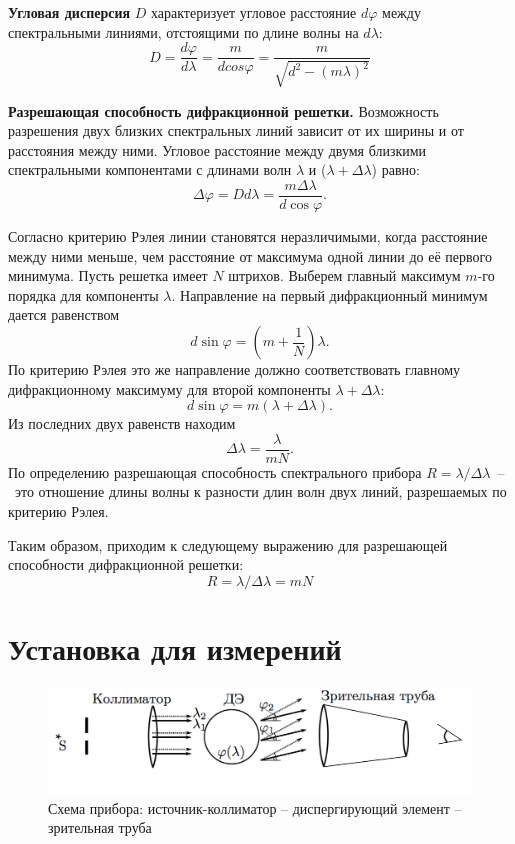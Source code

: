\documentclass{letask}
\begin{document}
\textbf{Угловая дисперсия} $D$ характеризует угловое расстояние $d \varphi$ между спектральными линиями, отстоящими по длине волны на $d \lambda$:
\[
D=\dfrac{d \varphi}{d \lambda}=\frac{m}{d cos \varphi}=\dfrac{m}{\sqrt{d^{2}-(m \lambda)^{2}}}
\]

\textbf{Разрешающая способность дифракционной решетки.} Возможность разрешения двух близких спектральных линий зависит от их ширины и от расстояния между ними. Угловое расстояние между двумя близкими спектральными компонентами с длинами волн $\lambda$ и ($\lambda + \Delta \lambda$) равно:
\[
\Delta \varphi =  D d \lambda = \frac{m \Delta \lambda}{d \cos{\varphi}}.
\]

Согласно критерию Рэлея линии становятся неразличимыми, когда расстояние между ними меньше, чем расстояние от максимума одной линии до её первого минимума. Пусть решетка имеет $N$ штрихов. Выберем главный максимум $m$-го порядка для компоненты $\lambda$. Направление на первый дифракционный минимум дается равенством 
\[ d \sin \varphi = \left( m + \dfrac{1}{N} \right) \lambda. \]
По критерию Рэлея это же направление должно соответствовать главному дифракционному максимуму для второй компоненты $\lambda + \Delta \lambda$:
\[ d \sin \varphi = m (\lambda + \Delta \lambda) .\]
Из последних двух равенств находим 
\[\Delta \lambda = \dfrac{\lambda}{mN}.\]
По определению разрешающая способность спектрального прибора $R = \lambda / \Delta \lambda$~--~это отношение длины волны к разности длин волн двух линий, разрешаемых по критерию Рэлея.

Таким образом, приходим к следующему выражению для разрешающей способности дифракционной решетки:
\[R = \lambda / \Delta \lambda = mN\]

\section{Установка для измерений}

\begin{figure}[H]
\centering
	\includegraphics[width = \lw]{scheme}
	\caption{Схема прибора: источник-коллиматор -- диспергирующий элемент -- зрительная труба}
	\label{fig:scheme}
\end{figure}
\end{document}
